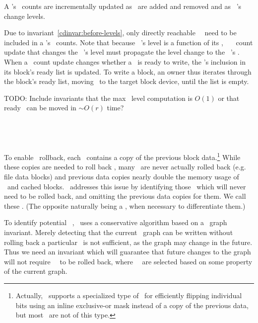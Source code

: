 A \chdesc's \before\ counts are incrementally updated
%
as \befores\ are added and removed
%
and as \beforing\ \chdesc's change levels.
%

Due to invariant~\ref{cdinvar:before-levels}, only directly reachable
\beforing\ \chdescs\ need to be included in a \chdesc's \before\ counts.
%
Note that because \anoop\ \chdesc's level is a function of its \befores,
%
\anoop\ \chdesc\ \before\ count update that changes the \noop\ \chdesc's level
must propagate the level change to the \noop\ \chdesc's \afters.
%
When a \before\ count update changes whether a \chdesc\ is ready to
write, the \chdesc's inclusion in its block's ready list is updated.
%
To write a block, an owner thus iterates through the block's ready
list, moving \chdescs\ to the target block device, until the list is
empty.

TODO: Include invariants that the max \before\ level computation is
$O(1)$ or that ready \chdescs\ can be moved in $\sim\! O(r)$ time?

\subsection{\Nrb\ \ChDescs}
\label{sec:chdescs:nrb}
To enable \chdesc\ rollback, each \chdesc\ contains a copy of the
previous block data.\footnote{Actually, \Kudos\ supports a specialized
type of \chdesc\ for efficiently flipping individual bits using an
inline exclusive-or mask instead of a copy of the previous data, but
most \chdescs\ are not of this type.}
%
While these copies are needed to roll back \chdescs, many
\chdescs\ are never actually rolled back (e.g. file data blocks) and
previous data copies nearly double the memory usage of \chdescs\ and
cached blocks.
%
\Kudos\ addresses this issue by identifying those \chdescs\ which will
never need to be rolled back, and omitting the previous data copies for
them. We call these \emph{\nrb} \chdescs. (The opposite naturally being
a \emph{\rb} \chdesc, when necessary to differentiate them.)

To identify potential \nrb\ \chdescs, \Kudos\ uses a conservative algorithm
based on a \chdesc\ graph invariant. Merely detecting that the current
\chdesc\ graph can be written without rolling back a particular \chdesc\ is
not sufficient, as the graph may change in the future. Thus we need an
invariant which will guarantee that future changes to the graph will not
require \nrb\ \chdescs\ to be rolled back, where \nrb\ \chdescs\ are
selected based on some property of the current graph.

